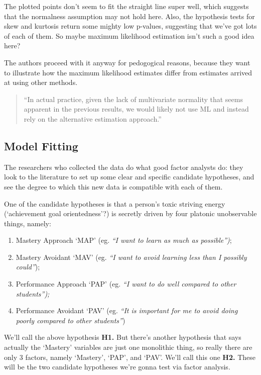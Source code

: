 \documentclass[
  letterpaper,
  DIV=11,
  numbers=noendperiod]{scrreprt}
\begin{document}
The plotted points don't seem to fit the straight line super well, which
suggests that the normalness assumption may not hold here. Also, the
hypothesis tests for skew and kurtosis return some mighty low p-values,
suggesting that we've got lots of each of them. So maybe maximum
likelihood estimation isn't such a good idea here?

The authors proceed with it anyway for pedogogical reasons, because they
want to illustrate how the maximum likelihood estimates differ from
estimates arrived at using other methods.

\begin{quote}
``In actual practice, given the lack of multivariate normality that
seems apparent in the previous results, we would likely not use ML and
instead rely on the alternative estimation approach.''
\end{quote}

\hypertarget{model-fitting}{%
\subsection*{Model Fitting}\label{model-fitting}}

The researchers who collected the data do what good factor analysts do:
they look to the literature to set up some clear and specific candidate
hypotheses, and see the degree to which this new data is compatible with
each of them.

One of the candidate hypotheses is that a person's toxic striving energy
(`achievement goal orientedness'?) is secretly driven by four platonic
unobservable things, namely:

\begin{enumerate}
\def\labelenumi{\arabic{enumi}.}
\item
  Mastery Approach `MAP' (eg. \emph{``I want to learn as much as
  possible'')};
\item
  Mastery Avoidant `MAV' (eg. \emph{``I want to avoid learning less than
  I possibly could''});
\item
  Performance Approach `PAP' (eg. \emph{``I want to do well compared to
  other students'');}
\item
  Performance Avoidant `PAV' (eg. \emph{``It is important for me to
  avoid doing poorly compared to other students''})
\end{enumerate}

We'll call the above hypothesis \textbf{H1.} But there's another
hypothesis that says actually the `Mastery' variables are just one
monolithic thing, so really there are only 3 factors, namely `Mastery',
`PAP', and `PAV'. We'll call this one \textbf{H2.} These will be the two
candidate hypotheses we're gonna test via factor analysis.
\end{document}
